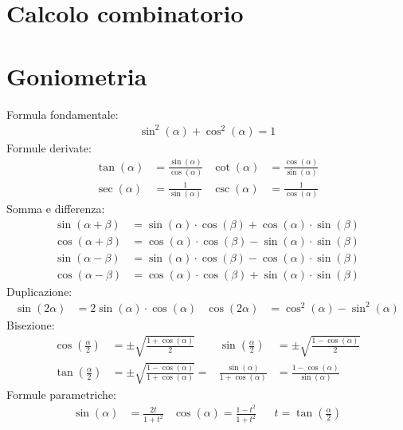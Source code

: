 \documentclass[a4paper]{article}
\begin{document}
	\section{Calcolo combinatorio}
	\newpage
	\section{Goniometria}
		
	Formula fondamentale:
	\begin{align*}
	\sin ^2 (\alpha) + \cos^2 (\alpha) = 1
	\end{align*}
	Formule derivate:
	\begin{align*}
	\tan (\alpha) & = \frac{\sin (\alpha)}{\cos (\alpha)} & \cot (\alpha) & = \frac{\cos (\alpha)}{\sin (\alpha)} \\
	\sec (\alpha) & = \frac{1}{\sin (\alpha)}             & \csc (\alpha) & = \frac{1}{\cos (\alpha)}
	\end{align*}
	Somma e differenza:
	\begin{align*}
	\sin (\alpha + \beta) & = \sin (\alpha) \cdot \cos (\beta) + \cos (\alpha) \cdot \sin (\beta)\\
	\cos (\alpha + \beta) & = \cos (\alpha) \cdot \cos (\beta) - \sin (\alpha) \cdot \sin (\beta)\\
	\sin (\alpha - \beta) & = \sin (\alpha) \cdot \cos (\beta) - \cos (\alpha) \cdot \sin (\beta)\\
	\cos (\alpha - \beta) & = \cos (\alpha) \cdot \cos (\beta) + \sin (\alpha) \cdot \sin (\beta)
	\end{align*}
	Duplicazione:
	\begin{align*}
	\sin (2 \alpha) & = 2 \sin (\alpha) \cdot \cos (\alpha)	&	\cos (2 \alpha) & = \cos^2 (\alpha) - \sin^2 (\alpha)
	\end{align*}
	Bisezione:
	\begin{align*}
	\cos \left(\frac{\alpha}{2}\right) &= \pm \sqrt{\frac{1 + \cos (\alpha)}{2}} & \sin \left(\frac{\alpha}{2}\right) &= \pm \sqrt{\frac{1 - \cos (\alpha)}{2}}\\
	\tan \left(\frac{\alpha}{2}\right) &= \pm \sqrt{\frac{1-\cos (\alpha)}{1+\cos (\alpha)}} = &\frac{\sin (\alpha)}{1+\cos (\alpha)} &= \frac{1-\cos (\alpha)}{\sin (\alpha)}
	\end{align*}
	Formule parametriche:
	\begin{align*}
	\sin (\alpha) &= \frac{2t}{1+t^2} & \cos (\alpha) = \frac{1 - t^2}{1 + t^2} & & t= \tan \left(\frac{\alpha}{2}\right)
	\end{align*}
	
\end{document}
